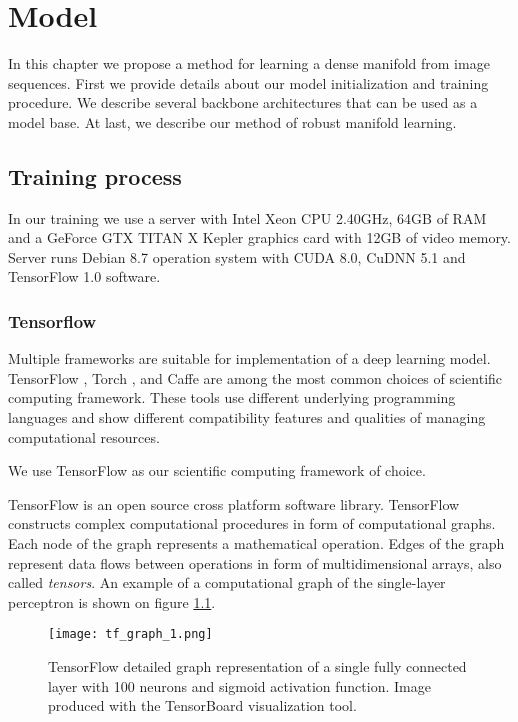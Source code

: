 
\chapter{Model}\label{ch:mode}

In this chapter we propose a method for learning a dense manifold from image sequences.
First we provide details about our model initialization and training procedure.
We describe several backbone architectures that can be used as a model base.
At last, we describe our method of robust manifold learning.


\section{Training process}

In our training we use a server with Intel Xeon CPU 2.40GHz, 64GB of RAM and a GeForce GTX TITAN X Kepler graphics card with 12GB of video memory. Server runs Debian 8.7 operation system with CUDA 8.0, CuDNN 5.1 and TensorFlow 1.0 software.

\subsection{Tensorflow}

Multiple frameworks are suitable for implementation of a deep learning model. TensorFlow \cite{GoogleResearch2015, Abadi2016}, Torch \cite{torch}, and Caffe \cite{jia2014caffe} are among the most common choices of scientific computing framework.
These tools use different underlying programming languages and show different compatibility features and qualities of managing computational resources.

We use TensorFlow as our scientific computing framework of choice.

TensorFlow is an open source cross platform software library.
TensorFlow constructs complex computational procedures in form of computational graphs.
Each node of the graph represents a mathematical operation.
Edges of the graph represent data flows between operations in form of multidimensional arrays, also called \textit{tensors}.
An example of a computational graph of the single-layer perceptron is shown on figure \ref{fig:tf_graph}.

\begin{figure}[h!]
  \centering
    \texttt{[image: tf\_graph\_1.png]}
  \caption{TensorFlow detailed graph representation of a single fully connected layer with 100 neurons and sigmoid activation function. Image produced with the TensorBoard visualization tool.}
  \label{fig:tf_graph}
\end{figure}


